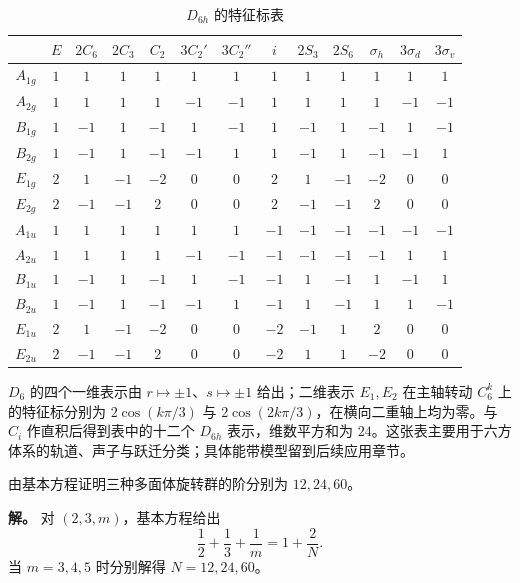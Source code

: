 \begin{table}[htbp]

\centering
\caption{$D_{6h}$ 的特征标表}
\label{tab:d6h-character}
\scriptsize
\setlength{\tabcolsep}{3pt}
\begin{tabular}{c|cccccccccccc}
\toprule
 & $E$ & $2C_6$ & $2C_3$ & $C_2$ & $3C_2'$ & $3C_2''$ & $i$ & $2S_3$ & $2S_6$ & $\sigma_h$ & $3\sigma_d$ & $3\sigma_v$ \\
\midrule
$A_{1g}$ & $1$&$1$&$1$&$1$&$1$&$1$&$1$&$1$&$1$&$1$&$1$&$1$ \\
$A_{2g}$ & $1$&$1$&$1$&$1$&$-1$&$-1$&$1$&$1$&$1$&$1$&$-1$&$-1$ \\
$B_{1g}$ & $1$&$-1$&$1$&$-1$&$1$&$-1$&$1$&$-1$&$1$&$-1$&$1$&$-1$ \\
$B_{2g}$ & $1$&$-1$&$1$&$-1$&$-1$&$1$&$1$&$-1$&$1$&$-1$&$-1$&$1$ \\
$E_{1g}$ & $2$&$1$&$-1$&$-2$&$0$&$0$&$2$&$1$&$-1$&$-2$&$0$&$0$ \\
$E_{2g}$ & $2$&$-1$&$-1$&$2$&$0$&$0$&$2$&$-1$&$-1$&$2$&$0$&$0$ \\
$A_{1u}$ & $1$&$1$&$1$&$1$&$1$&$1$&$-1$&$-1$&$-1$&$-1$&$-1$&$-1$ \\
$A_{2u}$ & $1$&$1$&$1$&$1$&$-1$&$-1$&$-1$&$-1$&$-1$&$-1$&$1$&$1$ \\
$B_{1u}$ & $1$&$-1$&$1$&$-1$&$1$&$-1$&$-1$&$1$&$-1$&$1$&$-1$&$1$ \\
$B_{2u}$ & $1$&$-1$&$1$&$-1$&$-1$&$1$&$-1$&$1$&$-1$&$1$&$1$&$-1$ \\
$E_{1u}$ & $2$&$1$&$-1$&$-2$&$0$&$0$&$-2$&$-1$&$1$&$2$&$0$&$0$ \\
$E_{2u}$ & $2$&$-1$&$-1$&$2$&$0$&$0$&$-2$&$1$&$1$&$-2$&$0$&$0$ \\
\bottomrule
\end{tabular}

\end{table}

$D_6$ 的四个一维表示由 $r\mapsto\pm1$、$s\mapsto\pm1$ 给出；二维表示 $E_1,E_2$ 在主轴转动 $C_6^k$ 上的特征标分别为 $2\cos(k\pi/3)$ 与 $2\cos(2k\pi/3)$，在横向二重轴上均为零。与 $C_i$ 作直积后得到表中的十二个 $D_{6h}$ 表示，维数平方和为 $24$。这张表主要用于六方体系的轨道、声子与跃迁分类；具体能带模型留到后续应用章节。

\begin{workedexample}
由基本方程证明三种多面体旋转群的阶分别为 $12,24,60$。

\textbf{解。} 对 $(2,3,m)$，基本方程给出
\[
\frac12+\frac13+\frac1m=1+\frac2N.
\]
当 $m=3,4,5$ 时分别解得 $N=12,24,60$。
\end{workedexample}


